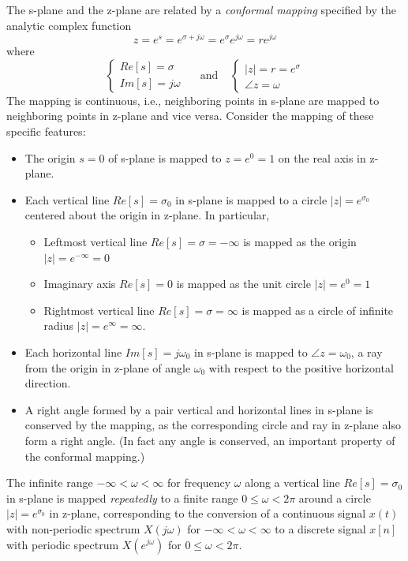 \documentclass{scrreprt}
\theoremstyle{plain}
\theoremstyle{definition}
\theoremstyle{remark}
\begin{document}
The s-plane and the z-plane are related by a {\em conformal mapping} specified
by the analytic complex function 
\[	z=e^s=e^{\sigma+j\omega}=e^\sigma e^{j\omega}=r e^{j\omega}	\]
where 
\[ \left\{ \begin{array}{l} Re[s]=\sigma \\ Im[s]=j\omega \end{array} \right.
\;\;\;\;\;\mbox{and}\;\;\;\;
\left\{ \begin{array}{l} |z|=r=e^\sigma \\ \angle{z}=\omega 
\end{array} \right.
\]
The mapping is continuous, i.e., neighboring points in s-plane are mapped
to neighboring points in z-plane and vice versa. Consider the mapping of these 
specific features: 
\begin{itemize}
	\item The origin $s=0$ of s-plane is mapped to $z=e^0=1$ on the real axis in
	z-plane.
	\item Each vertical line $Re[s]=\sigma_0$ in s-plane is mapped to a circle 
	$|z|=e^{\sigma_0}$ centered about the origin in z-plane. In particular,
	\begin{itemize}
		\item Leftmost vertical line $Re[s]=\sigma=-\infty$ is mapped as the 
		origin $|z|=e^{-\infty}=0$
		\item Imaginary axis $Re[s]=0$ is mapped as the unit circle 
		$|z|=e^0=1$
		\item Rightmost vertical line $Re[s]=\sigma=\infty$ is mapped as a 
		circle of infinite radius $|z|=e^{\infty}=\infty$.
	\end{itemize}
	\item Each horizontal line $Im[s]=j\omega_0$ in s-plane is mapped to 
	$\angle{z}=\omega_0$, a ray from the origin in z-plane of angle 
	$\omega_0$ with respect to the positive horizontal direction. 
	\item A right angle formed by a pair vertical and horizontal lines in s-plane
	is conserved by the mapping, as the corresponding circle and ray in z-plane 
	also form a right angle. (In fact any angle is conserved, an important
	property of the conformal mapping.)
\end{itemize}
The infinite range $-\infty < \omega < \infty$ for frequency $\omega$ along a 
vertical line $Re[s]=\sigma_0$ in s-plane is mapped {\em repeatedly} to a finite 
range $0 \le \omega < 2\pi$ around a circle $|z|=e^{\sigma_0}$ in z-plane, 
corresponding to the conversion of a continuous signal $x(t)$ with non-periodic 
spectrum $X(j\omega)$ for $-\infty < \omega < \infty$ to a discrete signal $x[n]$ 
with periodic spectrum $X(e^{j\omega})$ for $0 \le \omega < 2\pi$.
\end{document}
